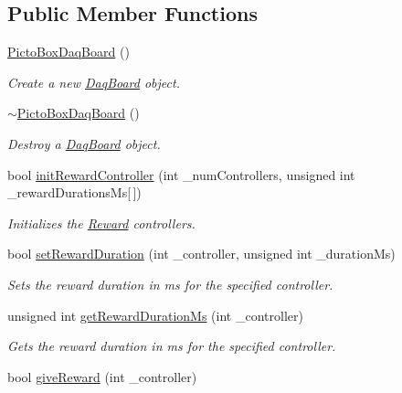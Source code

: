 \subsection*{Public Member Functions}
\begin{DoxyCompactItemize}
\item 
\hyperlink{class_picto_1_1_picto_box_daq_board_a29bd45ea040e9757338e904167058134}{Picto\-Box\-Daq\-Board} ()
\begin{DoxyCompactList}\small\item\em Create a new \hyperlink{class_daq_board}{Daq\-Board} object. \end{DoxyCompactList}\item 
\hyperlink{class_picto_1_1_picto_box_daq_board_af83dac8cea05f6faf994ae65dcefc938}{$\sim$\-Picto\-Box\-Daq\-Board} ()
\begin{DoxyCompactList}\small\item\em Destroy a \hyperlink{class_daq_board}{Daq\-Board} object. \end{DoxyCompactList}\item 
bool \hyperlink{class_picto_1_1_picto_box_daq_board_ab4774673f73e89e215979f86019adca4}{init\-Reward\-Controller} (int \-\_\-num\-Controllers, unsigned int \-\_\-reward\-Durations\-Ms\mbox{[}$\,$\mbox{]})
\begin{DoxyCompactList}\small\item\em Initializes the \hyperlink{class_picto_1_1_reward}{Reward} controllers. \end{DoxyCompactList}\item 
bool \hyperlink{class_picto_1_1_picto_box_daq_board_ac84de98078b4a96619cdcfa700246182}{set\-Reward\-Duration} (int \-\_\-controller, unsigned int \-\_\-duration\-Ms)
\begin{DoxyCompactList}\small\item\em Sets the reward duration in ms for the specified controller. \end{DoxyCompactList}\item 
unsigned int \hyperlink{class_picto_1_1_picto_box_daq_board_afbccda67c335b08cc6a06d702e01252c}{get\-Reward\-Duration\-Ms} (int \-\_\-controller)
\begin{DoxyCompactList}\small\item\em Gets the reward duration in ms for the specified controller. \end{DoxyCompactList}\item 
bool \hyperlink{class_picto_1_1_picto_box_daq_board_ab0dd5c82fc98ca47db98bc3c4406a3c5}{give\-Reward} (int \-\_\-controller)

\end{DoxyCompactItemize}
